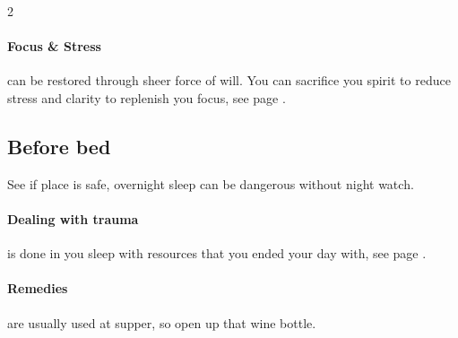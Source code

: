 \begin{multicols*}{2}
\paragraph{Focus \& Stress} can be restored through sheer force of will. 
You can sacrifice you spirit to reduce stress and clarity to replenish you focus, see page \pageref*{sec:recovery}.

\subsection*{Before bed}

See if place is safe, overnight sleep can be dangerous without night watch. 

\paragraph{Dealing with trauma} is done in you sleep with resources that you ended your day with, see page \pageref*{sec:healing}.

\paragraph{Remedies} are usually used at supper, so open up that wine bottle. 


\end{multicols*}
